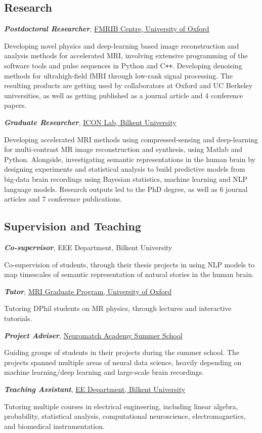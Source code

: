 \documentclass[10pt, a4paper]{article}
\newcommand{\note}[1]{\hspace*{5mm} \begin{minipage}{\dimexpr\textwidth-20pt} \small #1 \end{minipage} \newline}
\newcommand{\years}[1]{\marginnote{\scriptsize #1}}
\begin{document}
\subsection*{Research}
\years{2020-23}\textbf{\emph{Postdoctoral Researcher}}, \href{https://www.win.ox.ac.uk/research/physics-research}{FMRIB Centre, University of Oxford}\\
\note{
Developing novel physics and deep-learning based image reconstruction and analysis methods for accelerated MRI, involving extensive programming of the software tools and pulse sequences in Python and C\texttt{++}. Developing denoising methods for ultrahigh-field fMRI through low-rank signal processing. The resulting products are getting used by collaborators at Oxford and UC Berkeley universities, as well as getting published as a journal article and 4 conference papers. \\}
\years{2014-22}\textbf{\emph{Graduate Researcher}}, \href{http://www.icon.bilkent.edu.tr}{ICON Lab, Bilkent University}\\
\note{Developing accelerated MRI methods using compressed-sensing and deep-learning for multi-contrast MR image reconstruction and synthesis, using Matlab and Python. Alongside, investigating semantic representations in the human brain by designing experiments and statistical analysis to build predictive models from big-data brain recordings using Bayesian statistics, machine learning and NLP language models. Research outputs led to the PhD degree, as well as 6 journal articles and 7 conference publications.}
\subsection*{Supervision and Teaching}
\years{2020-21}\textbf{\emph{Co-supervisor}}, EEE Department, Bilkent University\\
\note{Co-supervision of students, through their thesis projects in using NLP models to map timescales of semantic representation of natural stories in the human brain.}
\years{2020-22}\textbf{\emph{Tutor}}, \href{https://www.ndcn.ox.ac.uk/study-with-us/graduate-students/fmrib-graduate-programme/course-descriptions}{MRI Graduate Program, University of Oxford}\\
\note{Tutoring DPhil students on MR physics, through lectures and interactive tutorials.}
\years{2021-22}\textbf{\emph{Project Adviser}}, \href{https://compneuro.neuromatch.io/index.html}{Neuromatch Academy Summer School}\\
\note{Guiding groups of students in their projects during the summer school. The projects spanned multiple areas of neural data science, heavily depending on machine learning/deep learning and large-scale brain recordings.}
\years{2014-20}\textbf{\emph{Teaching Assistant}}, \href{http://www.ee.bilkent.edu.tr/en/}{EE Department, Bilkent University}\\
\note{Tutoring multiple courses in electrical engineering, including linear algebra, probability, statistical analysis, computational neuroscience, electromagnetics, and biomedical instrumentation.}
\end{document}
